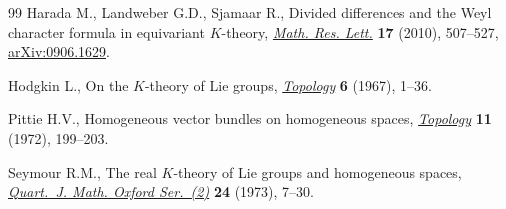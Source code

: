 \documentclass[pdftex]{sigma}
\numberwithin{equation}{section}
\begin{document}
\begin{thebibliography}{99}
Harada M., Landweber G.D., Sjamaar R., Divided dif\/ferences and the {W}eyl
  character formula in equivariant {$K$}-theory, \href{http://dx.doi.org/10.4310/MRL.2010.v17.n3.a10}{\textit{Math. Res. Lett.}}
  \textbf{17} (2010), 507--527, \href{http://arxiv.org/abs/0906.1629}{arXiv:0906.1629}.

Hodgkin L., On the {$K$}-theory of {L}ie groups, \href{http://dx.doi.org/10.1016/0040-9383(67)90010-9}{\textit{Topology}} \textbf{6}
  (1967), 1--36.

Pittie H.V., Homogeneous vector bundles on homogeneous spaces,
  \href{http://dx.doi.org/10.1016/0040-9383(72)90007-9}{\textit{Topology}} \textbf{11} (1972), 199--203.

Seymour R.M., The real {$K$}-theory of {L}ie groups and homogeneous spaces,
  \href{http://dx.doi.org/10.1093/qmath/24.1.7}{\textit{Quart.~J. Math. Oxford Ser.~(2)}} \textbf{24} (1973), 7--30.

\end{thebibliography}\LastPageEnding
\end{document}
